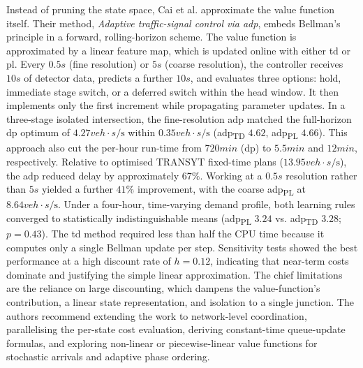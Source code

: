 \mynewline
Instead of pruning the state space, Cai et al. \cite{Cai2008} approximate the value function itself. Their method, \textit{Adaptive traffic-signal control via \ac{adp}}, embeds Bellman’s principle in a forward, rolling-horizon scheme. The value function is approximated by a linear feature map, which is updated online with either \ac{td} or \ac{pl}. Every $0.5\unit{s}$ (fine resolution) or $5\unit{s}$ (coarse resolution), the controller receives $10\unit{s}$ of detector data, predicts a further $10\unit{s}$, and evaluates three options: hold, immediate stage switch, or a deferred switch within the head window. It then implements only the first increment while propagating parameter updates.
In a three-stage isolated intersection, the fine-resolution \ac{adp} matched the full-horizon \ac{dp} optimum of $4.27\unit{veh\cdot s\per\second}$ within $0.35\unit{veh\cdot s\per\second}$ (\ac{adp}\textsubscript{TD} $4.62$, \ac{adp}\textsubscript{PL} $4.66$). This approach also cut the per-hour run-time from $720\unit{min}$ (\ac{dp}) to $5.5\unit{min}$ and $12\unit{min}$, respectively. Relative to optimised TRANSYT fixed-time plans ($13.95\unit{veh\cdot s\per\second}$), the \ac{adp} reduced delay by approximately $67\%$. Working at a $0.5\unit{s}$ resolution rather than $5\unit{s}$ yielded a further $41\%$ improvement, with the coarse \ac{adp}\textsubscript{PL} at $8.64\unit{veh\cdot s\per\second}$. Under a four-hour, time-varying demand profile, both learning rules converged to statistically indistinguishable means (\ac{adp}\textsubscript{PL} $3.24$ vs. \ac{adp}\textsubscript{TD} $3.28$; $p=0.43$). The \ac{td} method required less than half the CPU time because it computes only a single Bellman update per step. Sensitivity tests showed the best performance at a high discount rate of $h=0.12$, indicating that near-term costs dominate and justifying the simple linear approximation. The chief limitations are the reliance on large discounting, which dampens the value-function’s contribution, a linear state representation, and isolation to a single junction. The authors recommend extending the work to network-level coordination, parallelising the per-state cost evaluation, deriving constant-time queue-update formulas, and exploring non-linear or piecewise-linear value functions for stochastic arrivals and adaptive phase ordering.
\mynewline
